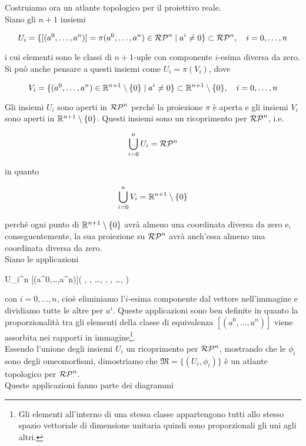 Costruiamo ora un atlante topologico per il proiettivo reale.\\
Siano gli $ n+1 $ insiemi

\begin{equation}
	U_{i} = \{ [(a^{0},\dots,a^{n})] = \pi(a^{0},\dots,a^{n}) \in \rp{n} \mid a^{i} \neq 0 \} \subset \rp{n} \qcomma i=0,\dots,n
\end{equation}

i cui elementi sono le classi di $ n+1 $-uple con componente $ i $-esima diversa da zero. Si può anche pensare a questi insiemi come $ U_{i} = \pi(V_{i}) $, dove

\begin{equation}
	V_{i} = \{ (a^{0},\dots,a^{n}) \in \R^{n+1} \setminus \{0\} \mid a^{i} \neq 0 \} \subset \R^{n+1} \setminus \{0\} \qcomma i=0,\dots,n
\end{equation}

Gli insiemi $ U_{i} $ sono aperti in $ \mathcal{RP}^{n} $ perché la proiezione $ \pi $ è aperta e gli insiemi $ V_{i} $ sono aperti in $ \mathbb{R}^{n+1} \setminus \{0\} $. Questi insiemi sono un ricoprimento per $ \mathcal{RP}^{n} $, i.e.

\begin{equation}
	\bigcup_{i=0}^{n} U_{i} = \mathcal{RP}^{n}
\end{equation}

in quanto

\begin{equation}
	\bigcup_{i=0}^{n} V_{i} = \mathbb{R}^{n+1} \setminus \{0\}
\end{equation}

perché ogni punto di $ \mathbb{R}^{n+1} \setminus \{0\} $ avrà almeno una coordinata diversa da zero e, conseguentemente, la sua proiezione su $ \mathcal{RP}^{n} $ avrà anch'essa almeno una coordinata diversa da zero.\\
Siano le applicazioni

	{U_{i}}{\R^{n}}
	{[(a^{0},\dots,a^{n})]}{\left( , , \dots, , , \dots,  \right)}

con $ i=0,\dots,n $, cioè eliminiamo l'$ i $-esima componente dal vettore nell'immagine e dividiamo tutte le altre per $ a^{i} $. Queste applicazioni sono ben definite in quanto la proporzionalità tra gli elementi della classe di equivalenza $ [(a^{0},\dots,a^{n})] $ viene assorbita nei rapporti in immagine\footnote{%
	Gli elementi all'interno di una stessa classe appartengono tutti allo stesso spazio vettoriale di dimensione unitaria quindi sono proporzionali gli uni agli altri.%
}.\\
Essendo l'unione degli insiemi $ U_{i} $ un ricoprimento per $ \mathcal{RP}^{n} $, mostrando che le $ \phi_{i} $ sono degli omeomorfismi, dimostriamo che $ \mathfrak{M} = \{(U_{i},\phi_{i})\} $ è un atlante topologico per $ \mathcal{RP}^{n} $.\\
Queste applicazioni fanno parte dei diagrammi

